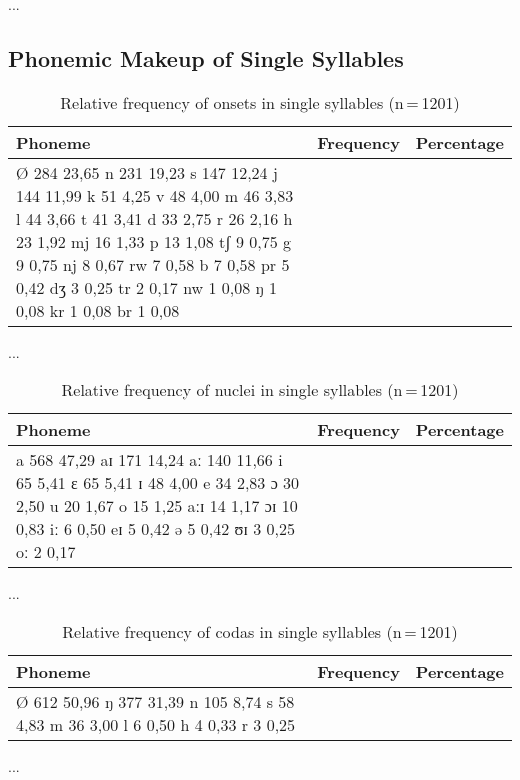 ...

\subsection{Phonemic Makeup of Single Syllables}

\begin{table}[hp]\centering
\caption[Relative frequency of onsets in single syllables]{Relative frequency of onsets in single syllables (n\,=\,1201)}
\begin{tabu} to 0.5\textwidth{X X[c] X[c]}
\tableheaderfont\toprule
Phoneme
	& Frequency
	& Percentage
	\\
	
\toprule

Ø	284	23,65%
n	231	19,23%
s	147	12,24%
j	144	11,99%
k	51	4,25%
v	48	4,00%
m	46	3,83%
l	44	3,66%
t	41	3,41%
d	33	2,75%
r	26	2,16%
h	23	1,92%
mj	16	1,33%
p	13	1,08%
tʃ	9	0,75%
g	9	0,75%
nj	8	0,67%
rw	7	0,58%
b	7	0,58%
pr	5	0,42%
dʒ	3	0,25%
tr	2	0,17%
nw	1	0,08%
ŋ	1	0,08%
kr	1	0,08%
br	1	0,08%

\bottomrule
\end{tabu}
\label{tab:singon}
\end{table}

...

\begin{table}[hp]\centering
\caption[Relative frequency of nuclei in single syllables]{Relative frequency of nuclei in single syllables (n\,=\,1201)}
\begin{tabu} to 0.5\textwidth{X X[c] X[c]}
\tableheaderfont\toprule
Phoneme
	& Frequency
	& Percentage
	\\
	
\toprule

a	568	47,29%
aɪ	171	14,24%
aː	140	11,66%
i	65	5,41%
ɛ	65	5,41%
ɪ	48	4,00%
e	34	2,83%
ɔ	30	2,50%
u	20	1,67%
o	15	1,25%
aːɪ	14	1,17%
ɔɪ	10	0,83%
iː	6	0,50%
eɪ	5	0,42%
ə	5	0,42%
ʊɪ	3	0,25%
oː	2	0,17%

\bottomrule
\end{tabu}
\label{tab:singnuc}
\end{table}

...

\begin{table}[hp]\centering
\caption[Relative frequency of codas in single syllables]{Relative frequency of codas in single syllables (n\,=\,1201)}
\begin{tabu} to 0.5\textwidth{X X[c] X[c]}
\tableheaderfont\toprule
Phoneme
	& Frequency
	& Percentage
	\\
	
\toprule

Ø	612	50,96%
ŋ	377	31,39%
n	105	8,74%
s	58	4,83%
m	36	3,00%
l	6	0,50%
h	4	0,33%
r	3	0,25%

\bottomrule
\end{tabu}
\label{tab:singcod}
\end{table}

...
